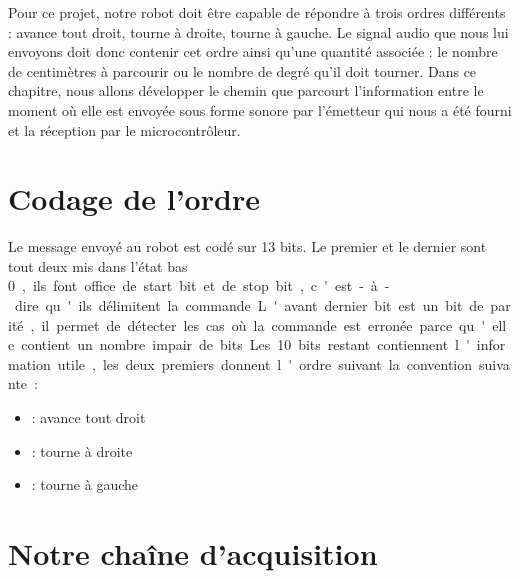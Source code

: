 Pour ce projet, notre robot doit être capable de répondre à trois ordres différents : avance tout droit, tourne à droite, tourne à gauche. Le signal audio que nous lui envoyons doit donc contenir cet ordre ainsi qu'une quantité associée : le nombre de centimètres à parcourir ou le nombre de degré qu'il doit tourner. Dans ce chapitre, nous allons développer le chemin que parcourt l'information entre le moment où elle est envoyée sous forme sonore par l'émetteur qui nous a été fourni et la réception par le microcontrôleur.

\section{Codage de l'ordre}
Le message envoyé au robot est codé sur 13 bits. Le premier et le dernier sont tout deux mis dans l'état bas \SI{0}, ils font office de start bit et de stop bit, c'est-à-dire qu'ils délimitent la commande. L'avant dernier bit est un bit de parité, il permet de détecter les cas où la commande est erronée parce qu'elle contient un nombre impair de bits. Les \SI{10} bits restant contiennent l'information utile, les deux premiers donnent l'ordre suivant la convention suivante :
\begin{itemize}
\item {} : avance tout droit
\item {} : tourne à droite
\item {} : tourne à gauche
\end{itemize}
\section{Notre chaîne d'acquisition}